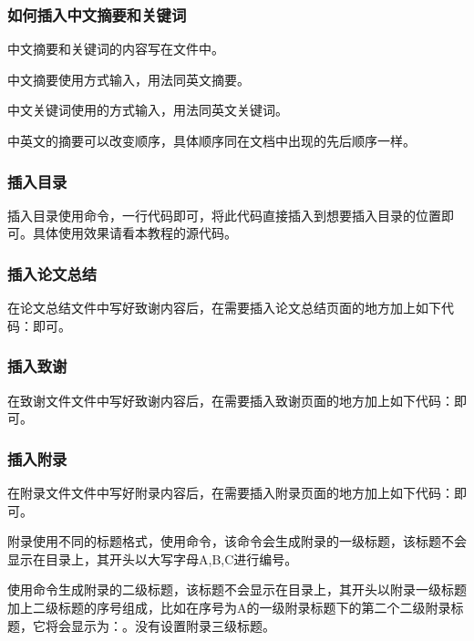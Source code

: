 \documentclass{nitthesis}
\begin{document}
\subsubsection{如何插入中文摘要和关键词}

中文摘要和关键词的内容写在文件中。

中文摘要使用方式输入，用法同英文摘要。

中文关键词使用的方式输入，用法同英文关键词。

中英文的摘要可以改变顺序，具体顺序同在文档中出现的先后顺序一样。

\subsubsection{插入目录}

插入目录使用命令，一行代码即可，将此代码直接插入到想要插入目录的位置即可。具体使用效果请看本教程的源代码。

\subsubsection{插入论文总结}

在论文总结文件中写好致谢内容后，在需要插入论文总结页面的地方加上如下代码：即可。

\subsubsection{插入致谢}

在致谢文件文件中写好致谢内容后，在需要插入致谢页面的地方加上如下代码：即可。

\subsubsection{插入附录}

在附录文件文件中写好附录内容后，在需要插入附录页面的地方加上如下代码：即可。

附录使用不同的标题格式，使用命令，该命令会生成附录的一级标题，该标题不会显示在目录上，其开头以大写字母A,B,C进行编号。

使用命令生成附录的二级标题，该标题不会显示在目录上，其开头以附录一级标题加上二级标题的序号组成，比如在序号为A的一级附录标题下的第二个二级附录标题，它将会显示为：。没有设置附录三级标题。
\end{document}
